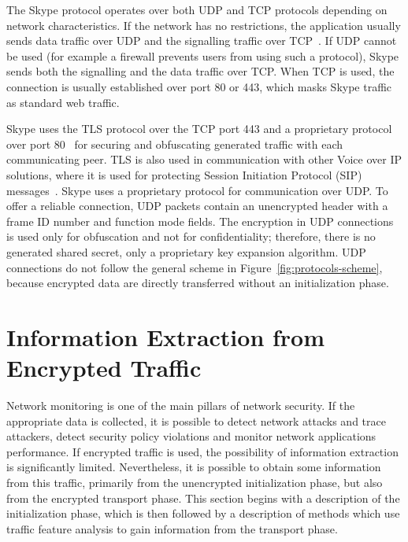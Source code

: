 The Skype protocol operates over both UDP and TCP protocols depending on network characteristics. If the network has no restrictions, the application usually sends data traffic over UDP and the signalling traffic over TCP~\cite{skype-hunter}. If UDP cannot be used (for example a firewall prevents users from using such a protocol), Skype sends both the signalling and the data traffic over TCP. When TCP is used, the connection is usually established over port 80 or 443, which masks Skype traffic as standard web traffic.

Skype uses the TLS protocol over the TCP port 443 and a proprietary protocol over port 80~\cite{skype-hunter} for securing and obfuscating generated traffic with each communicating peer. TLS is also used in communication with other Voice over IP solutions, where it is used for protecting Session Initiation Protocol (SIP) messages~\cite{skype-requirements}. Skype uses a proprietary protocol for communication over UDP. To offer a reliable connection, UDP packets contain an unencrypted header with a frame ID number and function mode fields. The encryption in UDP connections is used only for obfuscation and not for confidentiality; therefore, there is no generated shared secret, only a proprietary key expansion algorithm. UDP connections do not follow the general scheme in Figure~\ref{fig:protocols-scheme}, because encrypted data are directly transferred without an initialization phase.



\section{Information Extraction from Encrypted Traffic}\label{sec:extraction}


Network monitoring is one of the main pillars of network security. If the appropriate data is collected, it is possible to detect network attacks and trace attackers, detect security policy violations and monitor network applications performance. If encrypted traffic is used, the possibility of information extraction is significantly limited. Nevertheless, it is possible to obtain some information from this traffic, primarily from the unencrypted initialization phase, but also from the encrypted transport phase. This section begins with a description of the initialization phase, which is then followed by a description of methods which use traffic feature analysis to gain information from the transport phase.


